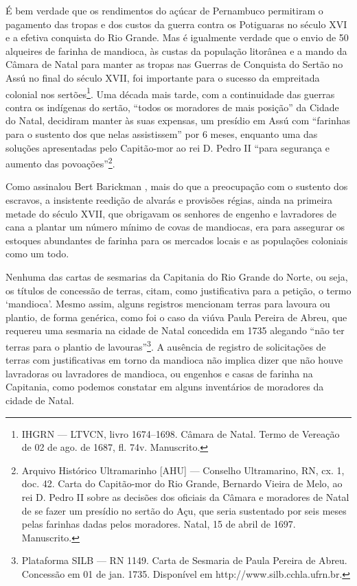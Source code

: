 \begin{refsection}
É bem verdade que os rendimentos do açúcar de Pernambuco permitiram o pagamento das tropas e dos custos da guerra contra os Potiguaras no século XVI e a efetiva conquista do Rio Grande. Mas é igualmente verdade que o envio de 50 alqueires de farinha de mandioca, às custas da população litorânea e a mando da Câmara de Natal para manter as tropas nas Guerras de Conquista do Sertão no Assú no final do século XVII, foi importante para o sucesso da empreitada colonial nos sertões\footnote{IHGRN --- LTVCN, livro 1674--1698. Câmara de Natal. Termo de Vereação de 02 de ago. de 1687, fl. 74v. Manuscrito.}. Uma década mais tarde, com a continuidade das guerras contra os indígenas do sertão, “todos os moradores de mais posição” da Cidade do Natal, decidiram manter às suas expensas, um presídio em Assú com “farinhas para o sustento dos que nelas assistissem” por 6 meses, enquanto uma das soluções apresentadas pelo Capitão-mor ao rei D. Pedro II “para segurança e aumento das povoações”\footnote{Arquivo Histórico Ultramarinho [AHU] --- Conselho Ultramarino, RN, cx. 1, doc. 42. Carta do Capitão-mor do Rio Grande, Bernardo Vieira de Melo, ao rei D. Pedro II sobre as decisões dos oficiais da Câmara e moradores de Natal de se fazer um presídio no sertão do Açu, que seria sustentado por seis meses pelas farinhas dadas pelos moradores. Natal, 15 de abril de 1697. Manuscrito.}.

Como assinalou Bert Barickman \citeyear{Barickman2003acucar}, mais do que a preocupação com o sustento dos escravos, a insistente reedição de alvarás e provisões régias, ainda na primeira metade do século XVII, que obrigavam os senhores de engenho e lavradores de cana a plantar um número mínimo de covas de mandiocas, era para assegurar os estoques abundantes de farinha para os mercados locais e as populações coloniais como um todo. 

Nenhuma das cartas de sesmarias da Capitania do Rio Grande do Norte, ou seja, os títulos de concessão de terras, citam, como justificativa para a petição, o termo `mandioca'. Mesmo assim, alguns registros mencionam terras para lavoura ou plantio, de forma genérica, como foi o caso da viúva Paula Pereira de Abreu, que requereu uma sesmaria na cidade de Natal concedida em 1735 alegando “não ter terras para o plantio de lavouras”\footnote{Plataforma SILB --- RN 1149. Carta de Sesmaria de Paula Pereira de Abreu. Concessão em 01 de jan. 1735. Disponível em http://www.silb.cchla.ufrn.br.}. A ausência de registro de solicitações de terras com justificativas em torno da mandioca não implica dizer que não houve lavradoras ou lavradores de mandioca, ou engenhos e casas de farinha na Capitania, como podemos constatar em alguns inventários de moradores da cidade de Natal.


\end{refsection}
